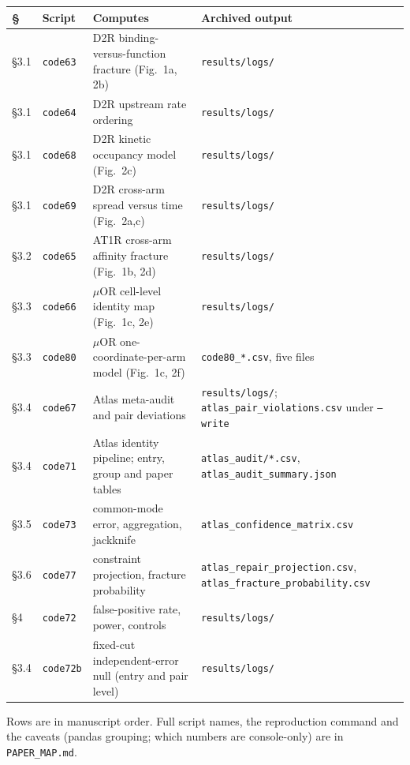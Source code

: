 \documentclass[11pt]{article}
\begin{document}
\begin{longtable}{p{0.9cm} p{3.4cm} p{5.6cm} p{4.0cm}}
\toprule
\S & Script & Computes & Archived output \\
\midrule
\endhead
\S3.1 & \texttt{code63} & D2R binding-versus-function fracture (Fig.~1a, 2b) & \texttt{results/logs/} \\
\S3.1 & \texttt{code64} & D2R upstream rate ordering & \texttt{results/logs/} \\
\S3.1 & \texttt{code68} & D2R kinetic occupancy model (Fig.~2c) & \texttt{results/logs/} \\
\S3.1 & \texttt{code69} & D2R cross-arm spread versus time (Fig.~2a,c) & \texttt{results/logs/} \\
\S3.2 & \texttt{code65} & AT1R cross-arm affinity fracture (Fig.~1b, 2d) & \texttt{results/logs/} \\
\S3.3 & \texttt{code66} & $\mu$OR cell-level identity map (Fig.~1c, 2e) & \texttt{results/logs/} \\
\S3.3 & \texttt{code80} & $\mu$OR one-coordinate-per-arm model (Fig.~1c, 2f) & \texttt{code80\_*.csv}, five files \\
\S3.4 & \texttt{code67} & Atlas meta-audit and pair deviations & \texttt{results/logs/}; \texttt{atlas\_pair\_\allowbreak{}violations.csv} under \texttt{--write} \\
\S3.4 & \texttt{code71} & Atlas identity pipeline; entry, group and paper tables & \texttt{atlas\_audit/*.csv}, \texttt{atlas\_audit\_\allowbreak{}summary.json} \\
\S3.5 & \texttt{code73} & common-mode error, aggregation, jackknife & \texttt{atlas\_\allowbreak{}confidence\_\allowbreak{}matrix.csv} \\
\S3.6 & \texttt{code77} & constraint projection, fracture probability & \texttt{atlas\_\allowbreak{}repair\_\allowbreak{}projection.csv}, \texttt{atlas\_\allowbreak{}fracture\_\allowbreak{}probability.csv} \\
\S4 & \texttt{code72} & false-positive rate, power, controls & \texttt{results/logs/} \\
\S3.4 & \texttt{code72b} & fixed-cut independent-error null (entry and pair level) & \texttt{results/logs/} \\
\bottomrule
\end{longtable}

\noindent Rows are in manuscript order. Full script names, the reproduction command and the
caveats (pandas grouping; which numbers are console-only) are in \texttt{PAPER\_MAP.md}.
\end{document}
